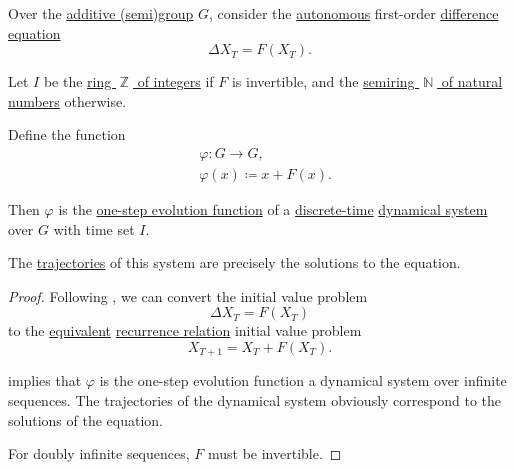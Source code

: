 \begin{proposition}\label{thm:autonomous_difference_equation_as_dynamical_system}
  Over the \hyperref[con:additive_semigroup]{additive (semi)group} \( G \), consider the \hyperref[def:difference_equation/autonomous]{autonomous} first-order \hyperref[def:difference_equation]{difference equation}
  \begin{equation*}
    \Delta X_T = F(X_T).
  \end{equation*}

  Let \( I \) be the \hyperref[def:integers]{ring \( \BbbZ \) of integers} if \( F \) is invertible, and the \hyperref[def:natural_numbers]{semiring \( \BbbN \) of natural numbers} otherwise.

  Define the function
  \begin{equation*}
    \begin{aligned}
      &\varphi: G \to G, \\
      &\varphi(x) \coloneqq x + F(x).
    \end{aligned}
  \end{equation*}

  Then \( \varphi \) is the \hyperref[def:one_step_evolution_function]{one-step evolution function} of a \hyperref[def:discrete_dynamical_system]{discrete-time} \hyperref[def:dynamical_system]{dynamical system} over \( G \) with time set \( I \).

  The \hyperref[def:dynamical_system_trajectory]{trajectories} of this system are precisely the solutions to the equation.
\end{proposition}
\begin{proof}
  Following , we can convert the initial value problem
  \begin{equation*}
    \Delta X_T = F(X_T)
  \end{equation*}
  to the \hyperref[def:equation/equivalent]{equivalent} \hyperref[def:recurrence_relation]{recurrence relation} initial value problem
  \begin{equation*}
    X_{T+1} = X_T + F(X_T).
  \end{equation*}

   implies that \( \varphi \) is the one-step evolution function a dynamical system over infinite sequences. The trajectories of the dynamical system obviously correspond to the solutions of the equation.

  For doubly infinite sequences, \( F \) must be invertible.
\end{proof}

